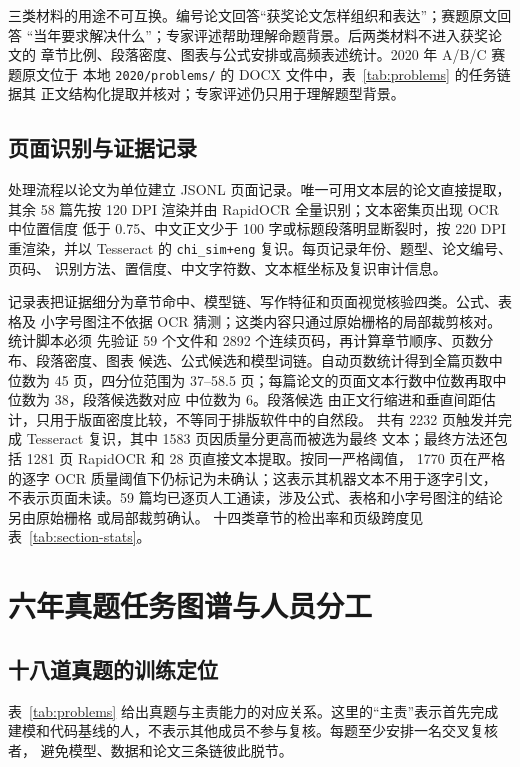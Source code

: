 \documentclass[UTF8,a4paper,12pt]{ctexart}
\begin{document}
三类材料的用途不可互换。编号论文回答“获奖论文怎样组织和表达”；赛题原文回答
“当年要求解决什么”；专家评述帮助理解命题背景。后两类材料不进入获奖论文的
章节比例、段落密度、图表与公式安排或高频表述统计。2020 年 A/B/C 赛题原文位于
本地 \texttt{2020/problems/} 的 DOCX 文件中，表~\ref{tab:problems} 的任务链据其
正文结构化提取并核对；专家评述仍只用于理解题型背景。

\subsection{页面识别与证据记录}

处理流程以论文为单位建立 JSONL 页面记录。唯一可用文本层的论文直接提取，其余
58 篇先按 120 DPI 渲染并由 RapidOCR 全量识别；文本密集页出现 OCR 中位置信度
低于 0.75、中文正文少于 100 字或标题段落明显断裂时，按 220 DPI 重渲染，并以
Tesseract 的 \texttt{chi\_sim+eng} 复识。每页记录年份、题型、论文编号、页码、
识别方法、置信度、中文字符数、文本框坐标及复识审计信息。

记录表把证据细分为章节命中、模型链、写作特征和页面视觉核验四类。公式、表格及
小字号图注不依据 OCR 猜测；这类内容只通过原始栅格的局部裁剪核对。统计脚本必须
先验证 59 个文件和 2892 个连续页码，再计算章节顺序、页数分布、段落密度、图表
候选、公式候选和模型词链。自动页数统计得到全篇页数中位数为 45 页，四分位范围为
37--58.5 页；每篇论文的页面文本行数中位数再取中位数为 38，段落候选数对应
中位数为 6。段落候选
由正文行缩进和垂直间距估计，只用于版面密度比较，不等同于排版软件中的自然段。
共有 2232 页触发并完成 Tesseract 复识，其中 1583 页因质量分更高而被选为最终
文本；最终方法还包括 1281 页 RapidOCR 和 28 页直接文本提取。按同一严格阈值，
1770 页在严格的逐字 OCR 质量阈值下仍标记为未确认；这表示其机器文本不用于逐字引文，
不表示页面未读。59 篇均已逐页人工通读，涉及公式、表格和小字号图注的结论另由原始栅格
或局部裁剪确认。
十四类章节的检出率和页级跨度见表~\ref{tab:section-stats}。

\section{六年真题任务图谱与人员分工}

\subsection{十八道真题的训练定位}

表~\ref{tab:problems} 给出真题与主责能力的对应关系。这里的“主责”表示首先完成
建模和代码基线的人，不表示其他成员不参与复核。每题至少安排一名交叉复核者，
避免模型、数据和论文三条链彼此脱节。
\end{document}

